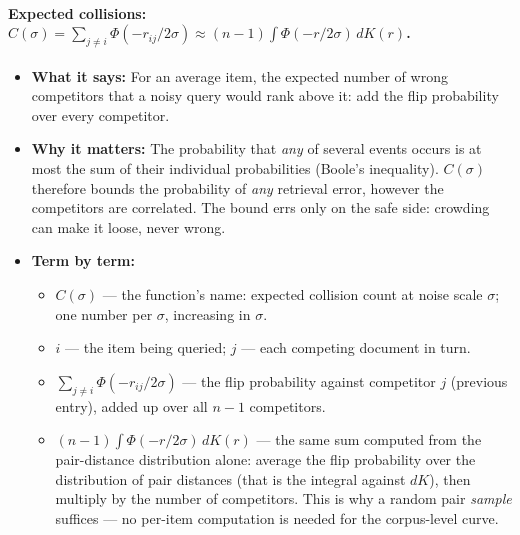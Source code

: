 \documentclass[11pt,letterpaper]{article}
\begin{document}
\paragraph{Expected collisions: $C(\sigma) = \sum_{j \ne i} \Phi(-r_{ij} /
2\sigma) \approx (n{-}1) \int \Phi(-r/2\sigma)\, dK(r)$.}
\begin{itemize}
  \item \textbf{What it says:} For an average item, the expected number of
  wrong competitors that a noisy query would rank above it: add the flip
  probability over every competitor.
  \item \textbf{Why it matters:} The probability that \emph{any} of several events occurs is at most the
  sum of their individual probabilities (Boole's inequality).
  $C(\sigma)$ therefore bounds the probability of \emph{any} retrieval
  error, however the competitors are correlated. The bound errs only on
  the safe side: crowding can make it loose, never wrong.
  \item \textbf{Term by term:}
  \begin{itemize}
    \item $C(\sigma)$ --- the function's name: expected collision count at
    noise scale $\sigma$; one number per $\sigma$, increasing in $\sigma$.
    \item $i$ --- the item being queried; $j$ --- each competing document
    in turn.
    \item $\sum_{j \ne i} \Phi(-r_{ij}/2\sigma)$ --- the flip probability
    against competitor $j$ (previous entry), added up over all $n-1$
    competitors.
    \item $(n-1) \int \Phi(-r/2\sigma)\, dK(r)$ --- the same sum computed
    from the pair-distance distribution alone: average the flip probability
    over the distribution of pair distances (that is the integral against
    $dK$), then multiply by the number of competitors. This is why a
    random pair \emph{sample} suffices --- no per-item computation is
    needed for the corpus-level curve.
  \end{itemize}
\end{itemize}
\end{document}
